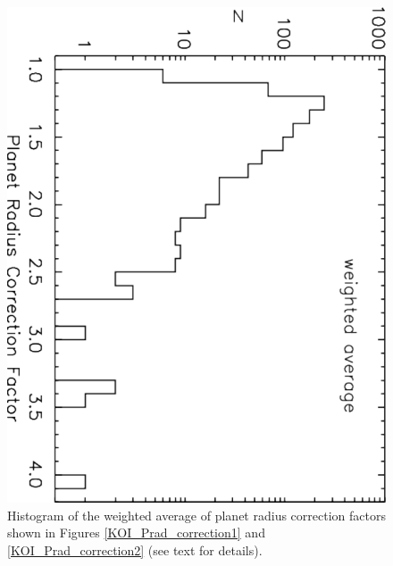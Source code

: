 \documentclass[twocolumn,appendixfloats]{aastex6}
\begin{document}
\begin{figure}[!]
\centering
\includegraphics[angle=90,scale=0.4]{KOI_Prad_correction_factors_average_histo.pdf}
\caption{Histogram of the weighted average of planet radius correction factors 
shown in Figures \ref{KOI_Prad_correction1} and \ref{KOI_Prad_correction2}
(see text for details).
\label{KOI_Prad_correction3}}
\end{figure}
\end{document}

